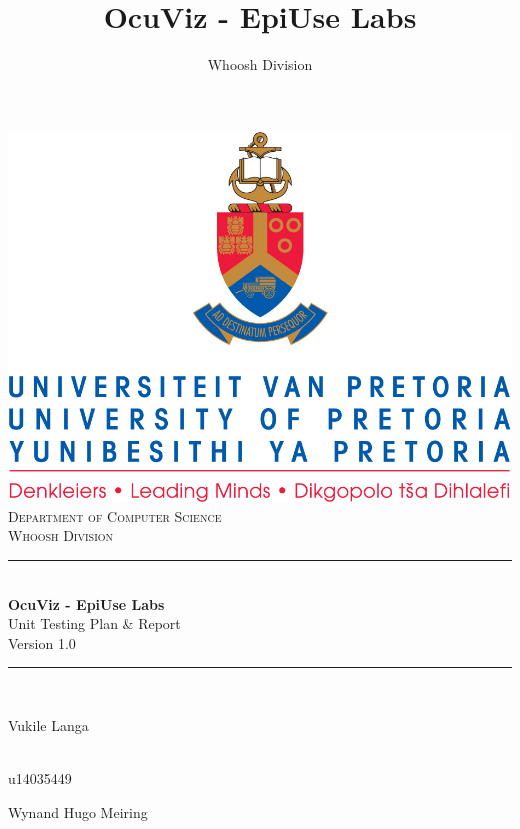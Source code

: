 \documentclass[a4paper,12pt]{article}
\newcommand{\HRule}{\rule{\linewidth}{0.5mm}}
\begin{document}
\author{Whoosh Division}
\title{OcuViz - EpiUse Labs}
\setlength{\parskip}{6pt}

\begin{titlepage}
\begin{center}
\includegraphics[scale=1]{../Spec/images/up-logo.jpg}\\[0.4cm]    
\textsc{\LARGE Department of Computer Science}\\[1.5cm]
\textsc{\Large Whoosh Division}\\[0.5cm]
\HRule \\[0.4cm]
{ \huge \bfseries OcuViz - EpiUse Labs}\\[0.4cm]
{ \huge Unit Testing Plan \& Report}\\[0.4cm]
{ Version 1.0 }\\[0.4cm]
\HRule \\[0.4cm]
\begin{minipage}{0.4\textwidth}
\begin{flushleft} \large
Vukile {Langa}
\end{flushleft}
\end{minipage}
\begin{minipage}{0.4\textwidth}
\begin{flushright} \large
\emph{} \\
u14035449 
\end{flushright}
\end{minipage}
\begin{minipage}{0.4\textwidth}
\begin{flushleft} \large
Wynand Hugo Meiring

\end{flushleft}
\end{minipage}
\end{center}
\end{titlepage}
\end{document}
